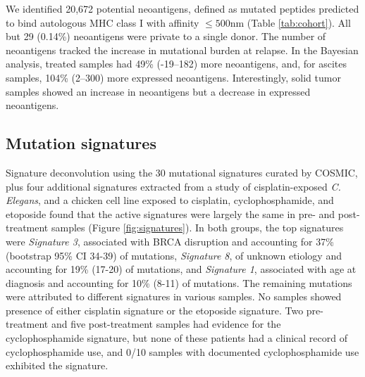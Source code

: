 We identified 20,672 potential neoantigens, defined as mutated peptides predicted to bind autologous MHC class I with affinity $\leq 500$nm (Table \ref{tab:cohort}). All but 29 (0.14\%) neoantigens were private to a single donor. The number of neoantigens tracked the increase in mutational burden at relapse. In the Bayesian analysis, treated samples had 49\% (-19--182) more neoantigens, and, for ascites samples, 104\% (2--300) more expressed neoantigens. Interestingly, solid tumor samples showed an increase in neoantigens but a decrease in expressed neoantigens.



\subsection*{Mutation signatures}
Signature deconvolution using the 30 mutational signatures curated by COSMIC\cite{364242}, plus four additional signatures extracted from a study of cisplatin-exposed \textit{C. Elegans}\cite{Meier_2014}, and a chicken cell line exposed to cisplatin, cyclophosphamide, and etoposide\cite{Szikriszt_2016} found that the active signatures were largely the same in pre- and post-treatment samples (Figure \ref{fig:signatures}). In both groups, the top signatures were \textit{Signature 3}, associated with BRCA disruption and accounting for 37\% (bootstrap 95\% CI 34-39) of mutations, \textit{Signature 8}, of unknown etiology and accounting for 19\% (17-20) of mutations, and \textit{Signature 1}, associated with age at diagnosis and accounting for 10\% (8-11) of mutations. The remaining mutations were attributed to different signatures in various samples. No samples showed presence of either cisplatin signature or the etoposide signature. Two pre-treatment and five post-treatment samples had evidence for the cyclophosphamide signature, but none of these patients had a clinical record of cyclophosphamide use, and 0/10 samples with documented cyclophosphamide use exhibited the signature.

